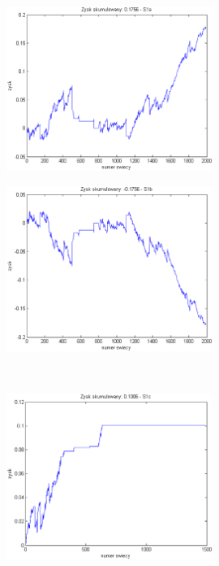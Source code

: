 \documentclass{tewiart}
\begin{document}
\begin{figure}[h]
\centering
\begin{minipage}{\linewidth}
\centering
\includegraphics[width=0.6\textwidth]{images/cadchfS1a.eps}
\label{jedno}
\end{minipage}
\begin{minipage}{\linewidth}
\centering
\includegraphics[width=0.6\textwidth]{images/cadchfS1b.eps}
\label{dwu}
\end{minipage}
\\
\begin{minipage}{\linewidth}
\centering
\includegraphics[width=0.6\textwidth]{images/cadchfS1c.eps}

\end{minipage}
\end{figure}
\end{document}
